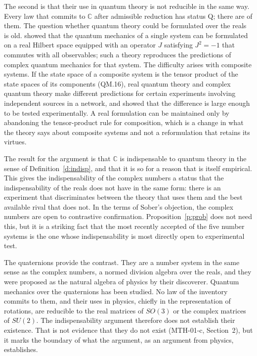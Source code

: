 \documentclass{situationist-preprint}
\begin{document}
The second is that their use in quantum theory is not reducible in the same way. Every law that commits to $\mathbb C$ after admissible reduction has status Q; there are \nMinC{} of them. The question whether quantum theory could be formulated over the reals is old. \citet{Stueckelberg1960} showed that the quantum mechanics of a single system can be formulated on a real Hilbert space equipped with an operator $J$ satisfying $J^2 = -1$ that commutes with all observables; such a theory reproduces the predictions of complex quantum mechanics for that system. The difficulty arises with composite systems. If the state space of a composite system is the tensor product of the state spaces of its components (QM.16), real quantum theory and complex quantum theory make different predictions for certain experiments involving independent sources in a network, and \citet{Renou2021} showed that the difference is large enough to be tested experimentally. A real formulation can be maintained only by abandoning the tensor-product rule for composition, which is a change in what the theory says about composite systems and not a reformulation that retains its virtues.

The result for the argument is that $\mathbb C$ is indispensable to quantum theory in the sense of Definition~\ref{d:indisp}, and that it is so for a reason that is itself empirical. This gives the indispensability of the complex numbers a status that the indispensability of the reals does not have in the same form: there is an experiment that discriminates between the theory that uses them and the best available rival that does not. In the terms of Sober's objection, the complex numbers are open to contrastive confirmation. Proposition~\ref{p:prob} does not need this, but it is a striking fact that the most recently accepted of the five number systems is the one whose indispensability is most directly open to experimental test.

The quaternions provide the contrast. They are a number system in the same sense as the complex numbers, a normed division algebra over the reals, and they were proposed as the natural algebra of physics by their discoverer. Quantum mechanics over the quaternions has been studied. No law of the inventory commits to them, and their uses in physics, chiefly in the representation of rotations, are reducible to the real matrices of $SO(3)$ or the complex matrices of $SU(2)$. The indispensability argument therefore does not establish their existence. That is not evidence that they do not exist (MTH-01-c, Section~2), but it marks the boundary of what the argument, as an argument from physics, establishes.
\end{document}
